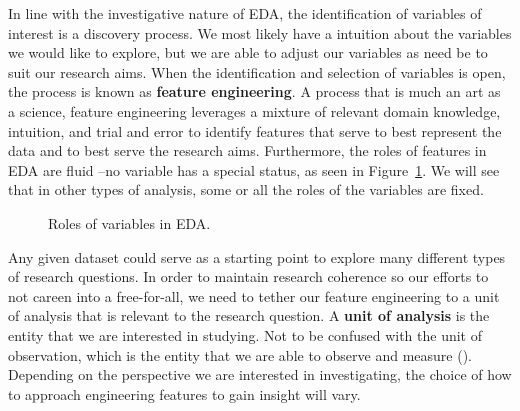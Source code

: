 \documentclass[
  letterpaper,
  DIV=11,
  numbers=noendperiod]{scrreprt}
\theoremstyle{definition}
\theoremstyle{remark}
\begin{document}
In line with the investigative nature of EDA, the identification of
variables of interest is a discovery process. We most likely have a
intuition about the variables we would like to explore, but we are able
to adjust our variables as need be to suit our research aims. When the
identification and selection of variables is open, the process is known
as \textbf{feature engineering}. A process that is much an art as a
science, feature engineering leverages a mixture of relevant domain
knowledge, intuition, and trial and error to identify features that
serve to best represent the data and to best serve the research aims.
Furthermore, the roles of features in EDA are fluid --no variable has a
special status, as seen in Figure~\ref{fig-eda-variables}. We will see
that in other types of analysis, some or all the roles of the variables
are fixed.

\begin{figure}[H]


\caption{\label{fig-eda-variables}Roles of variables in EDA.}

\end{figure}%

Any given dataset could serve as a starting point to explore many
different types of research questions. In order to maintain research
coherence so our efforts to not careen into a free-for-all, we need to
tether our feature engineering to a unit of analysis that is relevant to
the research question. A \textbf{unit of analysis} is the entity that we
are interested in studying. Not to be confused with the unit of
observation, which is the entity that we are able to observe and measure
(). Depending on the
perspective we are interested in investigating, the choice of how to
approach engineering features to gain insight will vary.
\end{document}
